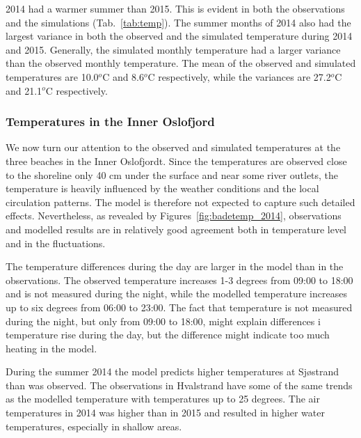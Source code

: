 2014 had a warmer summer than 2015. This is evident in both the observations and the simulations (Tab.~\ref{tab:temp}). The summer months of 2014 also had the largest variance in both the observed and the simulated temperature during 2014 and 2015. Generally, the simulated monthly temperature had a larger variance than the observed monthly temperature. The mean of the observed and simulated temperatures are 10.0$^o$C and 8.6$^o$C respectively, while the variances are 27.2$^o$C and 21.1$^o$C respectively.  


\clearpage
\subsubsection{Temperatures in the Inner Oslofjord}
We now turn our attention to the observed and simulated temperatures at the three beaches in the Inner Oslofjordt. Since the temperatures are observed close to the shoreline only 40 cm under the surface and near some river outlets, the temperature is heavily influenced by the weather conditions and the local circulation patterns. The model is therefore not expected to capture such detailed effects. Nevertheless, as revealed by Figures~\ref{fig:badetemp_2014}, observations and modelled results are in relatively good agreement both in temperature level and in the fluctuations.


The temperature differences during the day are larger in the model than in the observations. The observed temperature increases 1-3 degrees from 09:00 to 18:00 and is not measured during the night, while the modelled temperature increases up to six degrees from 06:00 to 23:00. The fact that temperature is not measured during the night, but only from 09:00 to 18:00, might explain differences i temperature rise during the day, but the difference might indicate too much heating in the model.

During the summer 2014 the model predicts higher temperatures at Sj\o strand than was observed. The observations in Hvalstrand have some of the same trends as the modelled temperature with temperatures up to 25 degrees. The air temperatures in 2014 was higher than in 2015 and resulted in higher water temperatures, especially in shallow areas. 

\clearpage 
